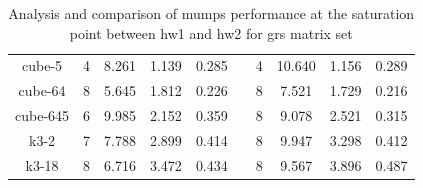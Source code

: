 \begin{table}[htpb]
\begin{tabular}{c|c|c|c|c|c|c|c|c|c|}
\multicolumn{1}{|c|}{cube-5}                                                & 4   & 8.261                                                              & 1.139                                              & 0.285                                                  & \multicolumn{1}{c|}{} & 4   & 10.640                                                             & 1.156                                              & 0.289                                                  \\ \cline{1-5} \cline{7-10} 
\multicolumn{1}{|c|}{cube-64}                                               & 8   & 5.645                                                              & 1.812                                              & 0.226                                                  & \multicolumn{1}{c|}{} & 8   & 7.521                                                              & 1.729                                              & 0.216                                                  \\ \cline{1-5} \cline{7-10} 
\multicolumn{1}{|c|}{cube-645}                                              & 6   & 9.985                                                              & 2.152                                              & 0.359                                                  & \multicolumn{1}{c|}{} & 8   & 9.078                                                              & 2.521                                              & 0.315                                                  \\ \cline{1-5} \cline{7-10} 
\multicolumn{1}{|c|}{k3-2}                                                  & 7   & 7.788                                                              & 2.899                                              & 0.414                                                  & \multicolumn{1}{c|}{} & 8   & 9.947                                                              & 3.298                                              & 0.412                                                  \\ \cline{1-5} \cline{7-10} 
\multicolumn{1}{|c|}{k3-18}                                                 & 8   & 6.716                                                              & 3.472                                              & 0.434                                                  & \multicolumn{1}{c|}{} & 8   & 9.567                                                              & 3.896                                              & 0.487                                                  \\ \cline{1-5} \cline{7-10} 
\end{tabular}
\caption{Analysis and comparison of \gls{mumps} performance at the saturation point between \gls{hw1} and \gls{hw2} for \gls{grs} matrix set}
\label{table:pinning-comparison-grs-matrix-set}
\end{table}



